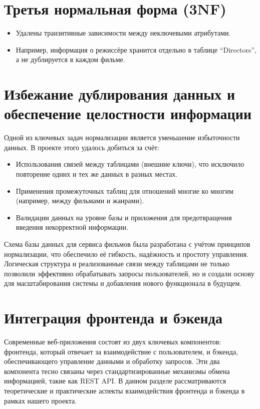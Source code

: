 \section{Третья нормальная форма (3NF)}
\begin{itemize}
    \item Удалены транзитивные зависимости между неключевыми атрибутами.
    \item Например, информация о режиссёре хранится отдельно в таблице ``Directors'', а не дублируется в каждом фильме.
\end{itemize}

\section{Избежание дублирования данных и обеспечение целостности информации}
Одной из ключевых задач нормализации является уменьшение избыточности данных. В проекте этого удалось добиться за счёт:
\begin{itemize}
    \item Использования связей между таблицами (внешние ключи), что исключило повторение одних и тех же данных в разных местах.
    \item Применения промежуточных таблиц для отношений многие ко многим (например, между фильмами и жанрами).
    \item Валидации данных на уровне базы и приложения для предотвращения введения некорректной информации.
\end{itemize}

Схема базы данных для сервиса фильмов была разработана с учётом принципов нормализации, что обеспечило её гибкость, надёжность и простоту управления. Логическая структура и реализованные связи между таблицами не только позволили эффективно обрабатывать запросы пользователей, но и создали основу для масштабирования системы и добавления нового функционала в будущем.

\section{Интеграция фронтенда и бэкенда}
Современные веб-приложения состоят из двух ключевых компонентов: фронтенда, который отвечает за взаимодействие с пользователем, и бэкенда, обеспечивающего управление данными и обработку запросов. Эти два компонента тесно связаны через стандартизированные механизмы обмена информацией, такие как REST API. В данном разделе рассматриваются теоретические и практические аспекты взаимодействия фронтенда и бэкенда в рамках нашего проекта.

